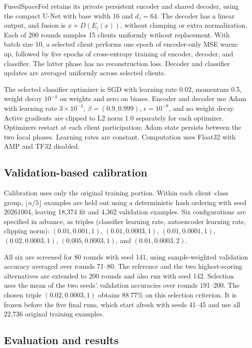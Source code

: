 FusedSpaceFed retains its private persistent encoder and shared decoder,
using the compact U-Net with base width 16 and $d_z=64$. The decoder has
a linear output, and fusion is $x+D(E_i(x))$, without clamping or extra
normalization. Each of 200 rounds samples 15 clients uniformly without
replacement. With batch size 10, a selected client performs one epoch
of encoder-only MSE warm-up, followed by five epochs of cross-entropy
training of encoder, decoder, and classifier. The latter phase has no
reconstruction loss. Decoder and classifier updates are averaged
uniformly across selected clients.

The selected classifier optimizer is SGD with learning rate 0.02,
momentum 0.5, weight decay $10^{-4}$ on weights and zero on biases.
Encoder and decoder use Adam with learning rate $3\times10^{-4}$,
$\beta=(0.9,0.999)$, $\epsilon=10^{-8}$, and no weight decay.
Active gradients are clipped to L2 norm 1.0 separately for each optimizer.
Optimizers restart at each client participation; Adam state persists
between the two local phases. Learning rates are constant. Computation
uses Float32 with AMP and TF32 disabled.

\subsection{Validation-based calibration}

Calibration uses only the original training portion. Within each
client--class group, $\lfloor n/5\rfloor$ examples are held out using a
deterministic hash ordering with seed 20261004, leaving 18,374 fit and
4,362 validation examples. Six configurations are specified in advance,
as triples (classifier learning rate, autoencoder learning rate, clipping
norm): $(0.01,0.001,1)$, $(0.01,0.0003,1)$, $(0.01,0.0001,1)$,
$(0.02,0.0003,1)$, $(0.005,0.0003,1)$, and $(0.01,0.0003,2)$.

All six are screened for 80 rounds with seed 141, using sample-weighted
validation accuracy averaged over rounds 71--80. The reference and the
two highest-scoring alternatives are extended to 200 rounds and also
run with seed 142. Selection uses the mean of the two seeds' validation
accuracies over rounds 191--200. The chosen triple $(0.02,0.0003,1)$
obtains $88.77\%$ on this selection criterion. It is frozen before the
five final runs, which start afresh with seeds 41--45 and use all 22,736
original training examples.

\subsection{Evaluation and results}

